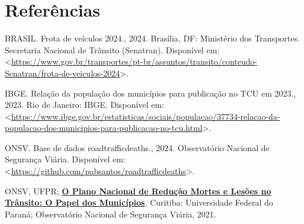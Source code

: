 \documentclass[
  letterpaper,
  DIV=11,
  numbers=noendperiod]{scrreprt}
\newlength{\cslhangindent}
\newenvironment{CSLReferences}[2] %
 {\begin{list}{}{%
  \setlength{\itemindent}{0pt}
  \setlength{\leftmargin}{0pt}
  \setlength{\parsep}{0pt}
  \ifodd #1
   \setlength{\leftmargin}{\cslhangindent}
   \setlength{\itemindent}{-1\cslhangindent}
  \fi
  \setlength{\itemsep}{#2\baselineskip}}}
 {\end{list}}
\begin{document}

\chapter*{Referências}\label{referuxeancias}


\label{refs}
\begin{CSLReferences}{0}{0}
BRASIL. Frota de veículos 2024., 2024. Brasília, DF: Ministério dos
Transportes. Secretaria Nacional de Trânsito (Senatran). Disponível em:
\textless{}\url{https://www.gov.br/transportes/pt-br/assuntos/transito/conteudo-Senatran/frota-de-veiculos-2024}\textgreater.

IBGE. Relação da população dos municípios para publicação no TCU em
2023., 2023. Rio de Janeiro: IBGE. Disponível em:
\textless{}\url{https://www.ibge.gov.br/estatisticas/sociais/populacao/37734-relacao-da-populacao-dos-municipios-para-publicacao-no-tcu.html}\textgreater.

ONSV. Base de dados roadtrafficdeaths., 2024. Observatório Nacional de
Segurança Viária. Disponível em:
\textless{}\url{https://github.com/pabsantos/roadtrafficdeaths}\textgreater.

ONSV, UFPR;
\textbf{\href{https://www.onsv.org.br/pdi/livro-pnatrans-o-papel-dos-municipios}{O
Plano Nacional de Redução Mortes e Lesões no Trânsito: O Papel dos
Municípios}}. Curitiba: Universidade Federal do Paraná; Observatório
Nacional de Segurança Viária, 2021.

\end{CSLReferences}
\end{document}
